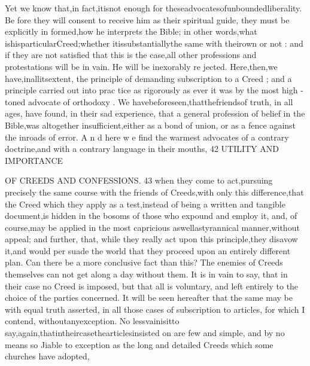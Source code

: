 \documentclass[
]{book}
\begin{document}
Yet we know that,in fact,itisnot enough for theseadvocatesofunboundedliberality. Be fore they will consent to receive him as their spiritual guide, they must be explicitly in formed,how he interprets the Bible; in other words,what ishisparticularCreed;whether itissubstantiallythe same with theirown or not : and if they are not satisfied that this is
the case,all other professions and protestations will be in vain. He will be inexorably re
jected. Here,then,we have,inallitsextent, the principle of demanding subscription to a Creed ; and a principle carried out into prac
tice as rigorously as ever it was by the most high -toned advocate of orthodoxy .
We havebeforeseen,thatthefriendsof truth, in all ages, have found, in their sad
experience, that a general profession of belief in the Bible,was altogether insufficient,either
as a bond of union, or as a fence against the inroads of error. A n d here w e find the
warmest advocates of a contrary doctrine,and with a contrary language in their mouths,
42 UTILITY AND IMPORTANCE

OF CREEDS AND CONFESSIONS. 43
when they come to act,pursuing precisely the same course with the friends of Creeds,with
only this difference,that the Creed which they apply as a test,instead of being a written and tangible document,is hidden in the bosoms of
those who expound and employ it, and, of
course,may be applied in the most capricious
aswellastyrannical manner,without appeal;
and further, that, while they really act upon
this principle,they disavow it,and would per suade the world that they proceed upon an
entirely different plan.
Can there be a more conclusive fact than
this? The enemies of Creeds themselves can
not get along a day without them. It is in
vain to say, that in their case no Creed is
imposed, but that all is voluntary, and left
entirely to the choice of the parties concerned. It will be seen hereafter that the same may be
with equal truth asserted, in all those cases of subscription to articles, for which I contend,
withoutanyexception. No lessvainisitto say,again,thatintheircasethearticlesinsisted on are few and simple, and by no means so
Jiable to exception as the long and detailed Creeds which some churches have adopted,
\end{document}
